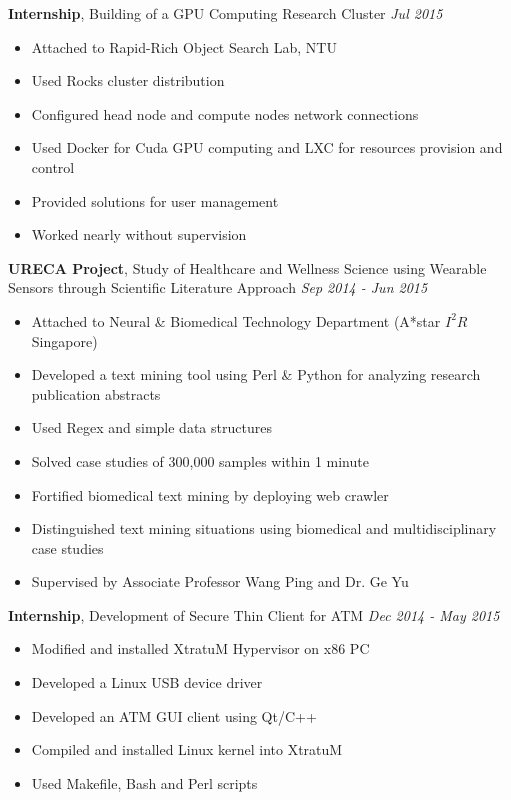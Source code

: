 \documentclass[a4paper, 12pt]{article}
\newenvironment{changemargin}[2]{%
  \begin{list}{}{%
      \setlength{\topsep}{0pt}%
      \setlength{\leftmargin}{#1}%
      \setlength{\rightmargin}{#2}%
      \setlength{\listparindent}{\parindent}%
      \setlength{\itemindent}{\parindent}%
      \setlength{\parsep}{\parskip}%
    }%
  \item[]}{\end{list}
}
\newenvironment{body}
{
\vspace*{-16pt}
\begin{changemargin}{-0.25in}{-0.5in}
}	
{
\end{changemargin}
}
\begin{document}
\begin{body}
  \vspace{14pt}

  \textbf{Internship}, {Building of a GPU Computing Research Cluster} \hfill \emph{Jul 2015}\\
  \vspace*{-4pt}
  \begin{itemize} \itemsep -0pt  \small
  \item Attached to Rapid-Rich Object Search Lab, NTU
  \item Used Rocks cluster distribution
  \item Configured head node and compute nodes network connections
  \item Used Docker for Cuda GPU computing and LXC for resources provision and control
  \item Provided solutions for user management
  \item Worked nearly without supervision
  \end{itemize}

  \textbf{URECA Project}, {Study of Healthcare and Wellness Science using Wearable Sensors through Scientific Literature Approach} \hfill \emph{Sep 2014 - Jun 2015}\\
  \vspace*{-4pt}
  \begin{itemize} \itemsep -0pt  \small
  \item Attached to Neural \& Biomedical Technology Department (A*star $I^{2}R$ Singapore)
  \item Developed a text mining tool using Perl \& Python for analyzing research publication abstracts
  \item Used Regex and simple data structures
  \item Solved case studies of 300,000 samples within 1 minute
  \item Fortified biomedical text mining by deploying web crawler
  \item Distinguished text mining situations using biomedical and multidisciplinary case studies
  \item Supervised by Associate Professor Wang Ping and Dr. Ge Yu
  \end{itemize}

  \textbf{Internship}, {Development of Secure Thin Client for ATM} \hfill \emph{Dec 2014 - May 2015}\\
  \vspace*{-4pt}
  \begin{itemize} \itemsep -0pt  \small
  \item Modified and installed XtratuM Hypervisor on x86 PC
  \item Developed a Linux USB device driver
  \item Developed an ATM GUI client using Qt/C++
  \item Compiled and installed Linux kernel into XtratuM
  \item Used Makefile, Bash and Perl scripts
  \end{itemize}


\end{body}
\end{document}
